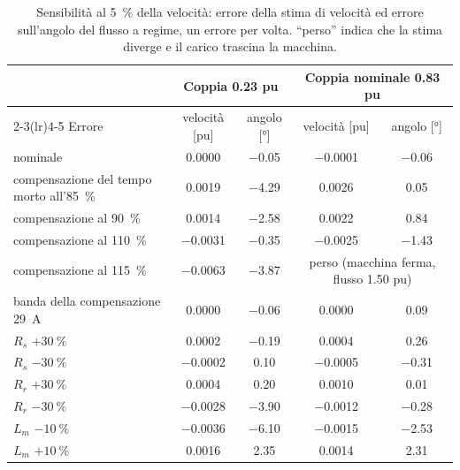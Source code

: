 \documentclass[10pt,a4paper]{scrartcl}
\begin{document}
\begin{onehalfspace}
\begin{table}[H]
\centering\small
\begin{tabular}{@{}lcccc@{}}
\toprule
 & \multicolumn{2}{c}{Coppia \num{0.23} pu} & \multicolumn{2}{c}{Coppia nominale \num{0.83} pu} \\
\cmidrule(lr){2-3}\cmidrule(lr){4-5}
Errore & velocità [pu] & angolo [\si{\degree}] & velocità [pu] & angolo [\si{\degree}] \\
\midrule
nominale & \num{0.0000} & \num{-0.05} & \num{-0.0001} & \num{-0.06} \\
compensazione del tempo morto all'\SI{85}{\percent} & \num{0.0019} & \num{-4.29} & \num{0.0026} & \num{0.05} \\
compensazione al \SI{90}{\percent} & \num{0.0014} & \num{-2.58} & \num{0.0022} & \num{0.84} \\
compensazione al \SI{110}{\percent} & \num{-0.0031} & \num{-0.35} & \num{-0.0025} & \num{-1.43} \\
compensazione al \SI{115}{\percent} & \num{-0.0063} & \num{-3.87} & \multicolumn{2}{c}{perso (macchina ferma, flusso \num{1.50} pu)} \\
banda della compensazione \SI{29}{A} & \num{0.0000} & \num{-0.06} & \num{0.0000} & \num{0.09} \\
$R_s$ $+\SI{30}{\percent}$ & \num{0.0002} & \num{-0.19} & \num{0.0004} & \num{0.26} \\
$R_s$ $-\SI{30}{\percent}$ & \num{-0.0002} & \num{0.10} & \num{-0.0005} & \num{-0.31} \\
$R_r$ $+\SI{30}{\percent}$ & \num{0.0004} & \num{0.20} & \num{0.0010} & \num{0.01} \\
$R_r$ $-\SI{30}{\percent}$ & \num{-0.0028} & \num{-3.90} & \num{-0.0012} & \num{-0.28} \\
$L_m$ $-\SI{10}{\percent}$ & \num{-0.0036} & \num{-6.10} & \num{-0.0015} & \num{-2.53} \\
$L_m$ $+\SI{10}{\percent}$ & \num{0.0016} & \num{2.35} & \num{0.0014} & \num{2.31} \\
\bottomrule
\end{tabular}
\caption{Sensibilità al \SI{5}{\percent} della velocità: errore della stima di velocità ed errore sull'angolo del flusso a regime, un errore per volta. ``perso'' indica che la stima diverge e il carico trascina la macchina.}
\label{tab:sensibilita}
\end{table}


\end{onehalfspace}
\end{document}
